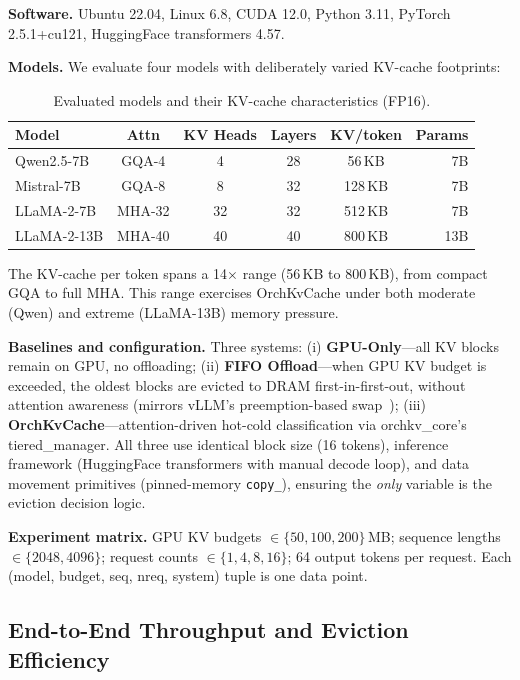 \documentclass[conference]{IEEEtran}
\begin{document}
\textbf{Software.} Ubuntu 22.04, Linux 6.8, CUDA 12.0, Python 3.11, PyTorch 2.5.1+cu121, HuggingFace transformers 4.57.

\textbf{Models.} We evaluate four models with deliberately varied KV-cache footprints:

\begin{table}[t]
\centering
\caption{Evaluated models and their KV-cache characteristics (FP16).}
\label{tab:models}
\small
\begin{tabular}{@{}lccccr@{}}
\toprule
Model & Attn & KV Heads & Layers & KV/token & Params \\
\midrule
Qwen2.5-7B   & GQA-4  & 4  & 28 & 56\,KB  & 7B  \\
Mistral-7B   & GQA-8  & 8  & 32 & 128\,KB & 7B  \\
LLaMA-2-7B   & MHA-32 & 32 & 32 & 512\,KB & 7B  \\
LLaMA-2-13B  & MHA-40 & 40 & 40 & 800\,KB & 13B \\
\bottomrule
\end{tabular}
\end{table}

The KV-cache per token spans a 14$\times$ range (56\,KB to 800\,KB), from compact GQA to full MHA. This range exercises OrchKvCache under both moderate (Qwen) and extreme (LLaMA-13B) memory pressure.

\textbf{Baselines and configuration.} Three systems: (i) \textbf{GPU-Only}---all KV blocks remain on GPU, no offloading; (ii) \textbf{FIFO Offload}---when GPU KV budget is exceeded, the oldest blocks are evicted to DRAM first-in-first-out, without attention awareness (mirrors vLLM's preemption-based swap~\cite{vllm}); (iii) \textbf{OrchKvCache}---attention-driven hot-cold classification via orchkv\_core's tiered\_manager. All three use identical block size (16 tokens), inference framework (HuggingFace transformers with manual decode loop), and data movement primitives (pinned-memory \texttt{copy\_}), ensuring the \emph{only} variable is the eviction decision logic.

\textbf{Experiment matrix.} GPU KV budgets $\in \{50, 100, 200\}$\,MB; sequence lengths $\in \{2048, 4096\}$; request counts $\in \{1, 4, 8, 16\}$; 64 output tokens per request. Each (model, budget, seq, nreq, system) tuple is one data point.

\subsection{End-to-End Throughput and Eviction Efficiency}
\label{sec:e2e}
\end{document}

